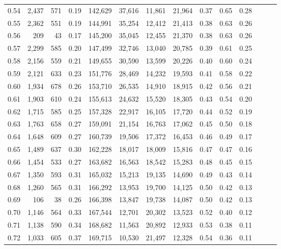 \begin{tabular}{rrrrrrrrrrrrrr}
0.54 &  2,437 &  571 &  0.19 &  142,629 &   37,616 &  11,861 &  21,964 &  0.37 &  0.65 &      0.28 \\
0.55 &  2,362 &  551 &  0.19 &  144,991 &   35,254 &  12,412 &  21,413 &  0.38 &  0.63 &      0.26 \\
0.56 &    209 &   43 &  0.17 &  145,200 &   35,045 &  12,455 &  21,370 &  0.38 &  0.63 &      0.26 \\
0.57 &  2,299 &  585 &  0.20 &  147,499 &   32,746 &  13,040 &  20,785 &  0.39 &  0.61 &      0.25 \\
0.58 &  2,156 &  559 &  0.21 &  149,655 &   30,590 &  13,599 &  20,226 &  0.40 &  0.60 &      0.24 \\
0.59 &  2,121 &  633 &  0.23 &  151,776 &   28,469 &  14,232 &  19,593 &  0.41 &  0.58 &      0.22 \\
0.60 &  1,934 &  678 &  0.26 &  153,710 &   26,535 &  14,910 &  18,915 &  0.42 &  0.56 &      0.21 \\
0.61 &  1,903 &  610 &  0.24 &  155,613 &   24,632 &  15,520 &  18,305 &  0.43 &  0.54 &      0.20 \\
0.62 &  1,715 &  585 &  0.25 &  157,328 &   22,917 &  16,105 &  17,720 &  0.44 &  0.52 &      0.19 \\
0.63 &  1,763 &  658 &  0.27 &  159,091 &   21,154 &  16,763 &  17,062 &  0.45 &  0.50 &      0.18 \\
0.64 &  1,648 &  609 &  0.27 &  160,739 &   19,506 &  17,372 &  16,453 &  0.46 &  0.49 &      0.17 \\
0.65 &  1,489 &  637 &  0.30 &  162,228 &   18,017 &  18,009 &  15,816 &  0.47 &  0.47 &      0.16 \\
0.66 &  1,454 &  533 &  0.27 &  163,682 &   16,563 &  18,542 &  15,283 &  0.48 &  0.45 &      0.15 \\
0.67 &  1,350 &  593 &  0.31 &  165,032 &   15,213 &  19,135 &  14,690 &  0.49 &  0.43 &      0.14 \\
0.68 &  1,260 &  565 &  0.31 &  166,292 &   13,953 &  19,700 &  14,125 &  0.50 &  0.42 &      0.13 \\
0.69 &    106 &   38 &  0.26 &  166,398 &   13,847 &  19,738 &  14,087 &  0.50 &  0.42 &      0.13 \\
0.70 &  1,146 &  564 &  0.33 &  167,544 &   12,701 &  20,302 &  13,523 &  0.52 &  0.40 &      0.12 \\
0.71 &  1,138 &  590 &  0.34 &  168,682 &   11,563 &  20,892 &  12,933 &  0.53 &  0.38 &      0.11 \\
0.72 &  1,033 &  605 &  0.37 &  169,715 &   10,530 &  21,497 &  12,328 &  0.54 &  0.36 &      0.11 \\

\end{tabular}
